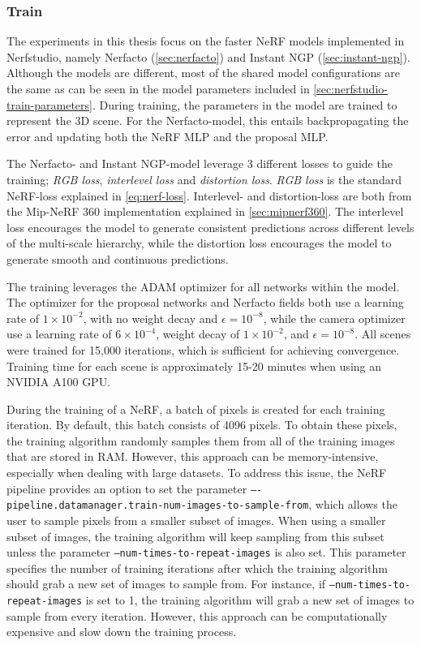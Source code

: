 \subsubsection{Train}

The experiments in this thesis focus on the faster NeRF models implemented in Nerfstudio, namely Nerfacto (\autoref{sec:nerfacto}) and Instant NGP (\autoref{sec:instant-ngp}). Although the models are different, most of the shared model configurations are the same as can be seen in the model parameters included in \autoref{sec:nerfstudio-train-parameters}. During training, the parameters in the model are trained to represent the 3D scene. For the Nerfacto-model, this entails backpropagating the error and updating both the NeRF MLP and the proposal MLP.

The Nerfacto- and Instant NGP-model leverage 3 different losses to guide the training; \textit{RGB loss}, \textit{interlevel loss} and \textit{distortion loss}. \textit{RGB loss} is the standard NeRF-loss explained in \autoref{eq:nerf-loss}. Interlevel- and distortion-loss are both from the Mip-NeRF 360 implementation explained in \autoref{sec:mipnerf360}. The interlevel loss encourages the model to generate consistent predictions across different levels of the multi-scale hierarchy, while the distortion loss encourages the model to generate smooth and continuous predictions.

The training leverages the ADAM optimizer for all networks within the model. The optimizer for the proposal networks and Nerfacto fields both use a learning rate of $1 \times 10^{-2}$, with no weight decay and $\epsilon=10^{-8}$, while the camera optimizer use a learning rate of $6 \times 10^{-4}$, weight decay of $1 \times 10^{-2}$, and $\epsilon=10^{-8}$. All scenes were trained for 15,000 iterations, which is sufficient for achieving convergence. Training time for each scene is approximately 15-20 minutes when using an NVIDIA A100 GPU.

During the training of a NeRF, a batch of pixels is created for each training iteration. By default, this batch consists of 4096 pixels. To obtain these pixels, the training algorithm randomly samples them from all of the training images that are stored in RAM. However, this approach can be memory-intensive, especially when dealing with large datasets. To address this issue, the NeRF pipeline provides an option to set the parameter \texttt{–-pipeline.datamanager.train-num-images-to-sample-from}, which allows the user to sample pixels from a smaller subset of images. When using a smaller subset of images, the training algorithm will keep sampling from this subset unless the parameter \texttt{--num-times-to-repeat-images} is also set. This parameter specifies the number of training iterations after which the training algorithm should grab a new set of images to sample from. For instance, if \texttt{--num-times-to-repeat-images} is set to 1, the training algorithm will grab a new set of images to sample from every iteration. However, this approach can be computationally expensive and slow down the training process.

